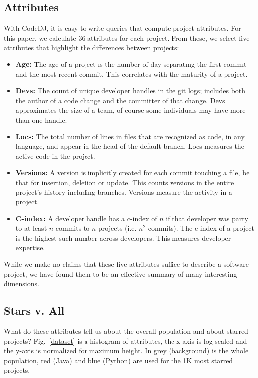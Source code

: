 \documentclass[sigconf,review,anonymous]{acmart}
\renewcommand{\dj}{{\textsf{Code{\small{DJ}}}}\xspace}
\begin{document}
\subsection{Attributes}

With \dj, it is easy to write queries that compute project attributes. For this
paper, we calculate 36 attributes for each project. From these, we select five
attributes that highlight the differences between projects:
\begin{itemize}[leftmargin=*]
\item{{\bf Age:}} The age of a project is the number of day separating the first
  commit and the most recent commit. This correlates with the maturity of a
  project.
\item{{\bf Devs:}} The count of unique developer handles in the git logs;
  includes both the author of a code change and the committer of that change.
  Devs approximates the size of a team, of course some individuals may have more
  than one handle.
\item{{\bf Locs:}} The total number of lines in files that are recognized as
  code, in any language, and appear in the head of the default branch. Locs
  measures the active code in the project.
\item{{\bf Versions:}} A version is implicitly created for each commit touching
  a file, be that for insertion, deletion or update. This counts versions in the
  entire project's history including branches. Versions measure the activity in
  a project.
\item{{\bf C-index:}} A developer handle has a c-index of $n$ if that developer
  was party to at least $n$ commits to $n$ projects (i.e. $n^2$ commits). The
  c-index of a project is the highest such number across developers. This
  measures developer expertise.
\end{itemize}

\noindent
While we make no claims that these five attributes suffice to describe a software
project, we have found them to be an effective summary of many interesting
dimensions.


\subsection{Stars v. All}

What do these attributes tell us about the overall population and about starred
projects? Fig.~\ref{dataset} is a histogram of attributes, the x-axis is log
scaled and the y-axis is normalized for maximum height. In grey (background) is
the whole population, red (Java) and blue (Python) are used for the 1K most
starred projects.
\end{document}
